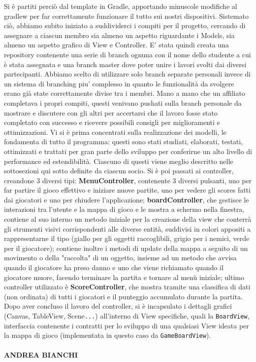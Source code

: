 \documentclass[a4paper,12pt]{report}
\begin{document}
Si è partiti perciò dal template in Gradle, apportando minuscole modifiche al gradlew per far correttamente funzionare il tutto sui nostri dispositivi. Sistemato ciò, abbiamo subito iniziato a suddividerci i compiti per il progetto, cercando di assegnare a ciascun membro  sia almeno un aspetto riguardante i Models, sia almeno un aspetto grafico di View e Controller. E' stata quindi creata una repository contenente una serie di branch ognuna con il nome dello studente a cui è stata assegnata e una branch master dove poter unire i lavori svolti dai diversi partecipanti. Abbiamo scelto di utilizzare solo branch separate personali invece di un sistema di branching piu’ complesso in quanto le funzionalità da svolgere erano già state correttamente divise tra i membri. Mano a mano che un affiliato completava i propri compiti, questi venivano pushati sulla branch personale da mostrare e discutere con gli altri per accertarsi che il lavoro fosse stato completato con successo e ricevere possibili consigli per miglioramenti e ottimizzazioni.
Vi si è prima concentrati sulla realizzazione dei modelli, le fondamenta di tutto il programma: questi sono stati studiati, elaborati, testati, ottimizzati e trattati per gran parte dello sviluppo per conferirne un alto livello di performance ed estendibilità. Ciascuno di questi viene meglio descritto nelle sottosezioni qui sotto definite da ciascun socio. Si è poi passati ai controller, creandone 3 diversi tipi: \textbf{MenuController}, contenente 3 diversi pulsanti, uno per far partire il gioco effettivo e iniziare nuove partite, uno per vedere gli scores fatti dai giocatori e uno per chiudere l'applicazione; \textbf{boardController}, che gestisce le interazioni tra l'utente e la mappa di gioco e le mostra a schermo nella finestra, contiene al suo interno un metodo iniziale per la creazione della view che conterrà gli strumenti visivi corrispondenti alle diverse entità, suddivisi in colori appositi a rappresentarne il tipo (giallo per gli oggetti raccoglibili, grigio per i nemici, verde per il giocatore); contiene inoltre i metodi di update della mappa a seguito di un movimento o della "raccolta" di un oggetto, insieme ad un metodo che avvisa quando il giocatore ha preso danno e uno che viene richiamato quando il giocatore muore, facendo terminare la partita e tornare al menù iniziale; ultimo controller utilizzato è \textbf{ScoreController}, che mostra tramite una classifica di dati (non ordinata) di tutti i giocatori e il punteggio accumulato durante la partita. Dopo aver concluso il lavoro del controller, si è incapsulato i dettagli grafici (Canvas, TableView, Scene\verb|...|) all'interno di View specifiche, quali la \verb|BoardView|, interfaccia contenente i contratti per lo sviluppo di una qualsiasi View ideata per la mappa di gioco (implementata in questo caso da \verb|GameBoardView|).
\\ \\
\textbf{ANDREA BIANCHI}
\end{document}
